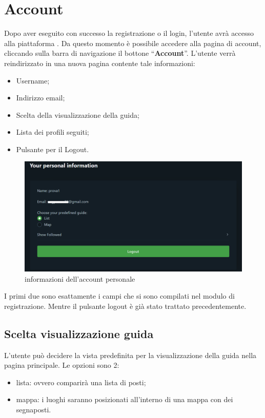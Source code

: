 \section{Account} {
    Dopo aver eseguito con successo la registrazione o il login, l'utente avrà accesso alla piattaforma \platform. Da questo momento
    è possibile accedere alla pagina di account, cliccando sulla barra di navigazione il bottone ``\textbf{Account}''. L'utente verrà reindirizzato
    in una nuova pagina contente tale informazioni: 
    \begin{itemize}
        \item Username;
        \item Indirizzo email;
        \item Scelta della visualizzazione della guida;
        \item Lista dei profili seguiti;
        \item Pulsante per il Logout.
    \end{itemize}

    \begin{figure}[H]
        \includegraphics[width=14cm]{sezioni/images/account.png}
        \centering
        \caption{informazioni dell'account personale}
    \end{figure}

    I primi due sono esattamente i campi che si sono compilati nel modulo di registrazione.
    Mentre il pulsante logout è già stato trattato precedentemente. 

    \subsection{Scelta visualizzazione guida} {
        L'utente può decidere la vista predefinita per la visualizzazione della guida nella pagina principale. 
        Le opzioni sono 2: 
        \begin{itemize}
            \item lista: ovvero comparirà una lista di posti;
            \item mappa: i luoghi saranno posizionati all'interno di una mappa con dei segnaposti.
        \end{itemize}
    }


}
